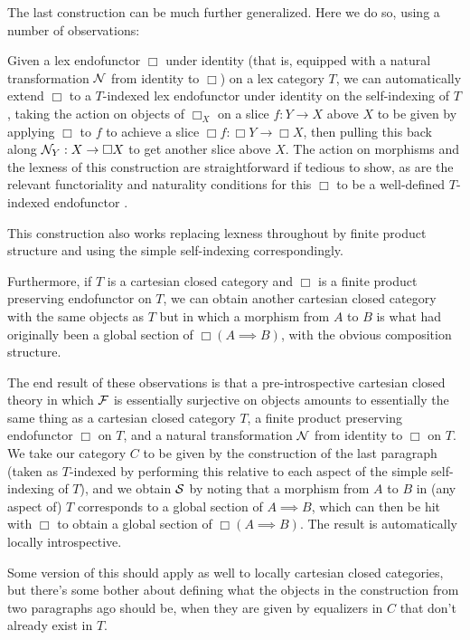 \documentclass[./main.tex]{subfiles}
\begin{document}
\begin{observation}\label{CartesianClosedLocallyIntrosp}
The last construction can be much further generalized. Here we do so, using a number of observations:

Given a lex endofunctor $\Box$ under identity (that is, equipped with a natural transformation $\mathcal{N}$ from identity to $\Box$) on a lex category $T$, we can automatically extend $\Box$ to a $T$-indexed lex endofunctor under identity on the self-indexing of $T$, taking the action on objects of $\Box_X$ on a slice $f : Y \to X$ above $X$ to be given by applying $\Box$ to $f$ to achieve a slice $\Box f : \Box Y \to \Box X$, then pulling this back along $\mathcal{N}_Y : X \to \Box X$ to get another slice above $X$. The action on morphisms and the lexness of this construction are straightforward if tedious to show, as are the relevant functoriality and naturality conditions for this $\Box$ to be a well-defined $T$-indexed endofunctor \TODO.

This construction also works replacing lexness throughout by finite product structure and using the simple self-indexing correspondingly.

Furthermore, if $T$ is a cartesian closed category and $\Box$ is a finite product preserving endofunctor on $T$, we can obtain another cartesian closed category with the same objects as $T$ but in which a morphism from $A$ to $B$ is what had originally been a global section of $\Box (A \implies B)$, with the obvious composition structure.

The end result of these observations is that a pre-introspective cartesian closed theory in which $\mathcal{F}$ is essentially surjective on objects amounts to essentially the same thing as a cartesian closed category $T$, a finite product preserving endofunctor $\Box$ on $T$, and a natural transformation $\mathcal{N}$ from identity to $\Box$ on $T$. We take our category $C$ to be given by the construction of the last paragraph (taken as $T$-indexed by performing this relative to each aspect of the simple self-indexing of $T$), and we obtain $\mathcal{S}$ by noting that a morphism from $A$ to $B$ in (any aspect of) $T$ corresponds to a global section of $A \implies B$, which can then be hit with $\Box$ to obtain a global section of $\Box (A \implies B)$. The result is automatically locally introspective.

Some version of this should apply as well to locally cartesian closed categories, but there's some bother about defining what the objects in the construction from two paragraphs ago should be, when they are given by equalizers in $C$ that don't already exist in $T$.


\end{observation}
\end{document}

